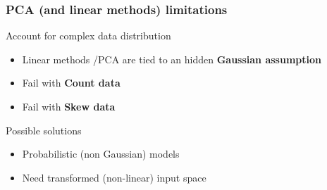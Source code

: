 \documentclass{beamer}\usepackage[]{graphicx}\usepackage[]{color}
\makeatletter
\newcommand{\hlnum}[1]{\textcolor[rgb]{0.686,0.059,0.569}{#1}}%
\newcommand{\hlstr}[1]{\textcolor[rgb]{0.192,0.494,0.8}{#1}}%
\newcommand{\hlopt}[1]{\textcolor[rgb]{0,0,0}{#1}}%
\newcommand{\hlstd}[1]{\textcolor[rgb]{0.345,0.345,0.345}{#1}}%
\newcommand{\hlkwc}[1]{\textcolor[rgb]{0.333,0.667,0.333}{#1}}%
\newcommand{\hlkwd}[1]{\textcolor[rgb]{0.737,0.353,0.396}{\textbf{#1}}}%
\newenvironment{kframe}{%
 \def\at@end@of@kframe{}%
 \ifinner\ifhmode%
  \def\at@end@of@kframe{\end{minipage}}%
  \begin{minipage}{\columnwidth}%
 \fi\fi%
 \def\FrameCommand##1{\hskip\@totalleftmargin \hskip-\fboxsep
 \colorbox{shadecolor}{##1}\hskip-\fboxsep
     \hskip-\linewidth \hskip-\@totalleftmargin \hskip\columnwidth}%
 \MakeFramed {\advance\hsize-\width
   \@totalleftmargin\z@ \linewidth\hsize
   \@setminipage}}%
 {\par\unskip\endMakeFramed%
 \at@end@of@kframe}
\newenvironment{knitrout}{}{} %
\makeatother
\begin{document}

\begin{frame}
  \frametitle{PCA (and linear methods) limitations}

  \begin{block}{Account for complex data distribution}
    \begin{itemize}
      \item Linear methods /PCA are tied to an hidden \alert{\bf Gaussian assumption}
      \item Fail with \alert{\bf Count data}
      \item Fail with \alert{\bf Skew data}
    \end{itemize}
  \end{block}
  
  \vfill
  
  \begin{block}{Possible solutions}
    \begin{itemize}
      \item Probabilistic (non Gaussian) models
      \item Need transformed (non-linear) input space
    \end{itemize}
  \end{block}
  
  \end{frame}
\end{document}
